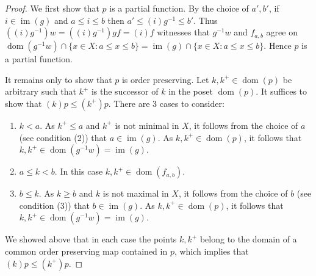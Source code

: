 \documentclass[10pt,a4paper]{amsart}
\newcommand{\dom}{\operatorname{dom}}
\newcommand{\im}{\operatorname{im}}
\begin{document}
\begin{proof}
We first show that \(p\) is a partial function. By the choice of \(a',b'\), if \(i\in \im(g)\) and \(a\leq i\leq b\) then \(a'\leq (i)g^{-1}\leq b'\). 
Thus \(((i)g^{-1})w=((i)g^{-1})gf=(i)f\) witnesses that \(g^{-1}w\) and \(f_{a,b}\) agree 
on $\dom(g^{-1}w)\cap \{x\in X: a\leq x\leq b\}=\im(g)\cap \{x\in X: a\leq x\leq b\}$.
Hence \(p\) is a partial function.

It remains only to show that \(p\) is order preserving. Let \(k,k^+\in \dom(p)\) be arbitrary such that \(k^+\) is the successor of \(k \) in the poset \(\dom(p)\). It suffices to show that \((k)p\leq (k^+)p\). There are 3 cases to consider:
\begin{enumerate}[\rm(a)]
    \item \(k<a\). As \(k^+\leq a\) and \(k^+\) is not minimal in \(X\), it follows from the choice of \(a\) (see condition (2)) that \(a\in \im(g)\).
    As \(k,k^+\in \dom(p)\), it follows that \(k,k^+\in \dom(g^{-1}w)=\im(g)\).
    \item \(a\leq k<b\). In this case \(k,k^+\in \dom(f_{a,b})\).
    \item \(b\leq k\). As \(k\geq b\) and \(k\) is not maximal in \(X\), it follows from the choice of \(b\) (see condition (3)) that \(b\in \im(g)\).
    As \(k,k^+\in \dom(p)\), it follows that \(k,k^+\in \dom(g^{-1}w)=\im(g)\).
\end{enumerate}

We showed above that in each case the points \(k,k^+\) belong to the domain of a common order preserving map contained in \(p\), which implies that \((k)p\leq (k^+)p\).
\end{proof}
\end{document}
